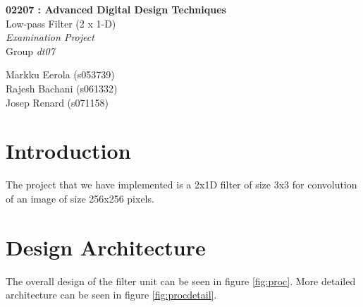 \documentclass[11pt,a4paper]{article}
\begin{document}
	

\begin{titlepage}

\thispagestyle{fancy}
\lhead{}
\rhead{}
\rule{0pt}{50pt}
\vspace{3cm}

\begin{center}
 	\huge{\textbf{02207 : Advanced Digital Design Techniques}}\\
 	\vspace{1cm}
 	\huge{Low-pass Filter (2 x 1-D)}\\
 	\vspace{1cm}
 	\huge{\textit{Examination Project}}\\
 	\vspace{1cm}
 	\huge{Group \textit{dt07}}\\
\end{center}

\vspace{4cm}

\begin{flushright}
	\LARGE{Markku Eerola (s053739)}\\
	\vspace{0.3cm}
	\LARGE{Rajesh Bachani (s061332)}\\
	\vspace{0.3cm}
	\LARGE{Josep Renard (s071158)}\\
\end{flushright}
\cfoot{\today}
\end{titlepage}

\newpage 
\tableofcontents

\newpage

\section{Introduction}
The project that we have implemented is a 2x1D filter of size 3x3 for convolution of an image of size 256x256 pixels.  

\section{Design Architecture}
The overall design of the filter unit can be seen in figure \ref{fig:proc}. More detailed architecture can be seen in figure \ref{fig:procdetail}.
\end{document}
